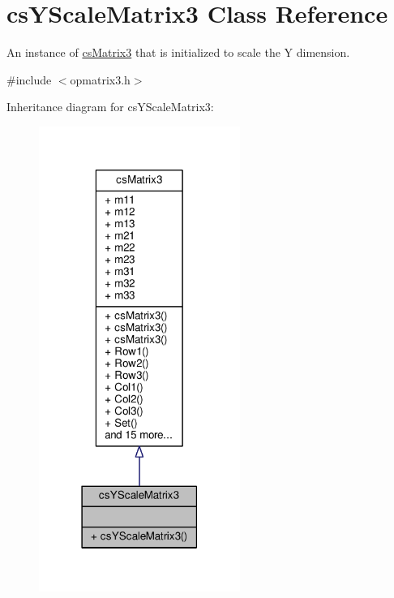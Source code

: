 \hypertarget{classcsYScaleMatrix3}{}\section{cs\+Y\+Scale\+Matrix3 Class Reference}
\label{classcsYScaleMatrix3}


An instance of \hyperlink{classcsMatrix3}{cs\+Matrix3} that is initialized to scale the Y dimension.  




{\ttfamily \#include $<$opmatrix3.\+h$>$}



Inheritance diagram for cs\+Y\+Scale\+Matrix3\+:
\nopagebreak
\begin{figure}[H]
\begin{center}
\leavevmode
\includegraphics[width=186pt]{d3/d22/classcsYScaleMatrix3__inherit__graph}
\end{center}
\end{figure}


